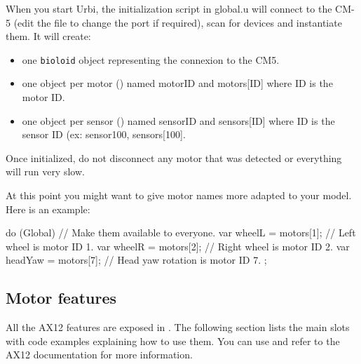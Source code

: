 When you start Urbi, the initialization script in global.u will connect to
the CM-5 (edit the file to change the port if required), scan for devices
and instantiate them. It will create:

\begin{itemize}
\item one \lstinline|bioloid| object representing the connexion to the CM5.
\item one object per motor () named motorID and motors[ID]
  where ID is the motor ID.
\item one object per sensor () named sensorID and
  sensors[ID] where ID is the sensor ID (ex: sensor100, sensors[100].
\end{itemize}

Once initialized, do not disconnect any motor that was detected or
everything will run very slow.

At this point you might want to give motor names more adapted to your model.
Here is an example:

\begin{urbiunchecked}
do (Global) // Make them available to everyone.
{
  var wheelL = motors[1];  // Left wheel is motor ID 1.
  var wheelR = motors[2];  // Right wheel is motor ID 2.
  var headYaw = motors[7]; // Head yaw rotation is motor ID 7.
};
\end{urbiunchecked}


\subsection{Motor features}
\def\currentObject{AX12}

All the AX12 features are exposed in \us. The following section lists
the main slots with code examples explaining how to use them. You can use
 and refer to the AX12 documentation for
more information.

